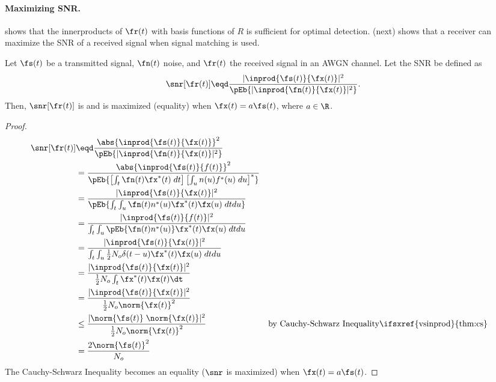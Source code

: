 {\paragraph{Maximizing SNR.}
 shows that the innerproducts of $\fr(t)$ with
basis functions of $R$ is sufficient for optimal detection.
 (next) shows that a receiver can
maximize the SNR of a received signal when signal matching is used.

\begin{theorem}
\label{thm:mf_maxSNR}
Let $\fs(t)$ be a transmitted signal, $\fn(t)$ noise, and $\fr(t)$ the received signal
in an AWGN channel.
Let the  SNR be defined as
   \[ \snr[\fr(t)] \eqd \frac{|\inprod{\fs(t)}{\fx(t)}|^2}
                            {\pEb{|\inprod{\fn(t)}{\fx(t)}|^2}}. \]
Then, $\snr[\fr(t)]$ is
and is maximized (equality) when $\fx(t)=a\fs(t)$, where $a\in\R$.
\end{theorem}

\begin{proof}
\begin{align*}
   \snr[\fr(t)]
     &\eqd \frac{\abs{\inprod{\fs(t)}{\fx(t)}}^2}
                {\pEb{|\inprod{\fn(t)}{\fx(t)}|^2}}
   \\&=    \frac{\abs{\inprod{\fs(t)}{f(t)}}^2}
                {\pEb{\left[\int_t \fn(t)\fx^\ast(t)\;dt\right]
                      \left[\int_u n(u)f^\ast(u)\;du\right]^\ast}
                }
   \\&=    \frac{|\inprod{\fs(t)}{\fx(t)}|^2}
                {\pEb{\int_t \int_u \fn(t)n^\ast(u)\fx^\ast(t)\fx(u)\;dtdu}}
   \\&=    \frac{|\inprod{\fs(t)}{f(t)}|^2}
                {\int_t \int_u \pEb{\fn(t)n^\ast(u)}\fx^\ast(t)\fx(u)\;dtdu}
   \\&=    \frac{|\inprod{\fs(t)}{\fx(t)}|^2}
                {\int_t \int_u \frac{1}{2}N_o\delta(t-u) \fx^\ast(t)\fx(u)\;dtdu}
   \\&=    \frac{|\inprod{\fs(t)}{\fx(t)}|^2}
                {\frac{1}{2}N_o \int_t \fx^\ast(t)\fx(t)\dt}
   \\&=    \frac{|\inprod{\fs(t)}{\fx(t)}|^2}
                {\frac{1}{2}N_o \norm{\fx(t)}^2}
   \\&\le  \frac{|\norm{\fs(t)}\;\norm{\fx(t)}|^2}
                {\frac{1}{2}N_o \norm{\fx(t)}^2}
     &&    \text{by Cauchy-Schwarz Inequality\ifsxref{vsinprod}{thm:cs}}
   \\&=    \frac{2\norm{\fs(t)}^2}
                {N_o }
\end{align*}
The Cauchy-Schwarz Inequality becomes an equality
($\snr$ is maximized) when $\fx(t)=a\fs(t)$.
\end{proof}

}
